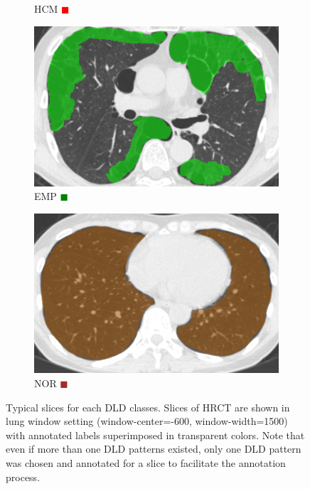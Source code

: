\begin{figure}[htbp]
\begin{subfigure}{.16\textwidth}
    \caption{HCM \textcolor{red}{$\blacksquare$}}
  \end{subfigure}
  \qquad
  \begin{subfigure}{.16\textwidth}
    \includegraphics[width=1\linewidth]{images/examples/emp.png}
    \caption{EMP \textcolor{green}{$\blacksquare$}}
  \end{subfigure}
  \qquad
  \begin{subfigure}{.16\textwidth}
    \includegraphics[width=1\linewidth]{images/examples/nor.png}
    \caption{NOR \textcolor{brown}{$\blacksquare$}}
  \end{subfigure}
  \caption{Typical slices for each DLD classes.
    Slices of HRCT are shown in  lung window setting (window-center=-600, window-width=1500) with annotated labels superimposed in transparent colors.
    Note that even if more than one DLD patterns existed, only one DLD pattern was chosen and annotated for a slice to facilitate the annotation process.}
  \label{image_examples}
\end{figure}
